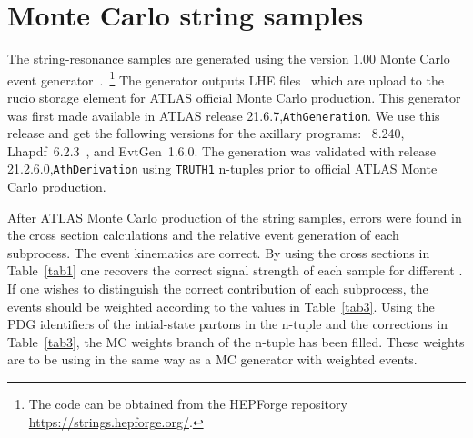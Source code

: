 





\section{Monte Carlo string samples}

The string-resonance samples are generated using the \str version 1.00
Monte Carlo event
generator~\cite{Vakilipourtakalou:2018pfo}.~\footnote{The code can be
obtained from the HEPForge
repository \url{https://strings.hepforge.org/}.} 
The generator outputs LHE files~\cite{Alwall:2006yp} which are upload
to the rucio storage element for ATLAS official Monte Carlo production.
This generator was first made available in ATLAS
release 21.6.7,\texttt{AthGeneration}.   
We use this release and get the following versions for the axillary
programs: \pythia~8.240, Lhapdf~6.2.3~\cite{Buckley:2014ana}, and
EvtGen~1.6.0. 
The generation was validated with
release 21.2.6.0,\texttt{AthDerivation} using \texttt{TRUTH1} n-tuples
prior to official ATLAS Monte Carlo production.

After ATLAS Monte Carlo production of the string samples, errors were
found in the cross section calculations and the relative event
generation of each subprocess.
The event kinematics are correct.
By using the cross sections in Table~\ref{tab1} one recovers the
correct signal strength of each sample for different \Ms.
If one wishes to distinguish the correct contribution of each
subprocess, the events should be weighted according to the values in
Table~\ref{tab3}. 
Using the PDG identifiers of the intial-state partons in the n-tuple
and the corrections in Table~\ref{tab3}, the MC weights branch of the
n-tuple has been filled. 
These weights are to be using in the same way as a MC generator with
weighted events.  

